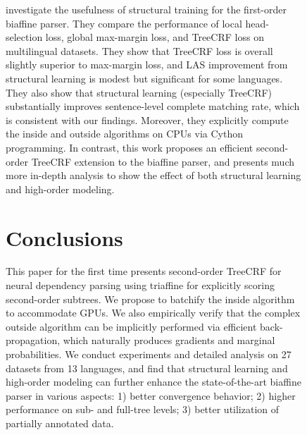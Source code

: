 \documentclass[11pt,a4paper]{article}
\begin{document}
\begin{figure}[tb]
\begin{center}
\begin{dependency}
\begin{deptext}[column sep=.16cm]
\citet{zhang-etal-2019-empirical} investigate the usefulness of structural training for the first-order biaffine parser.
They compare the performance of local head-selection loss, global max-margin loss, and TreeCRF loss on multilingual datasets.
They show that TreeCRF loss is overall slightly superior to max-margin loss, and LAS improvement from  structural learning is modest but significant for some languages.
They also show that structural learning (especially TreeCRF) substantially improves sentence-level complete matching rate, which is consistent with our findings.
Moreover, they explicitly compute the inside and outside algorithms on CPUs via Cython programming.
In contrast, this work proposes an efficient second-order TreeCRF extension to the biaffine parser,
and presents much more in-depth analysis to show the effect of both structural learning and high-order modeling.
































%
 \section{Conclusions}
\label{section:conclusions}


This paper for the first time presents second-order TreeCRF for neural dependency parsing using triaffine for explicitly scoring second-order subtrees.
We propose to batchify the inside algorithm to accommodate GPUs.
We also empirically verify that the complex outside algorithm can be implicitly performed via efficient back-propagation, which naturally produces gradients and
marginal probabilities.
We conduct experiments and detailed analysis on 27 datasets from 13 languages, and  find that structural learning and high-order modeling can further enhance  the state-of-the-art biaffine parser in various aspects: 1) better convergence behavior; 2) higher performance on sub- and full-tree levels; 3)
 better utilization of partially annotated data.
















\end{deptext}
\end{dependency}
\end{center}
\end{figure}
\end{document}
